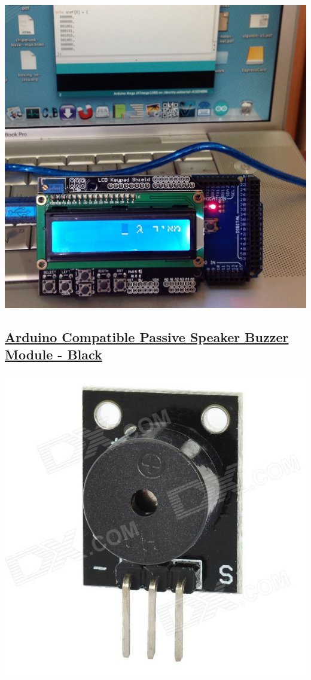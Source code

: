 \documentclass[11pt]{article}
\begin{document}
\includegraphics[width=.9\linewidth]{./files/lcd-rtl.jpg}
\subsection{\href{http://dx.com/p/arduino-diy-part-buzzer-module-black-138322}{Arduino Compatible Passive Speaker Buzzer Module - Black}}
\label{sec-4-4}

\includegraphics[width=.9\linewidth]{./files/sku_138322_1.jpg}
\end{document}
